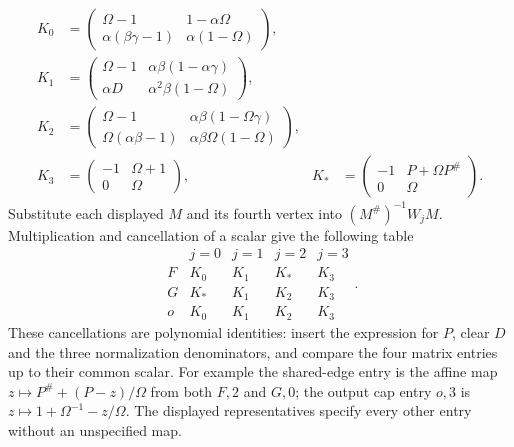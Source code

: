 \begin{equation}\label{sm:world-matrices}
\begin{aligned}
 K_0&=\begin{pmatrix}
 \Omega-1&1-\alpha\Omega\\
 \alpha(\beta\gamma-1)&\alpha(1-\Omega)
 \end{pmatrix},\\
 K_1&=\begin{pmatrix}
 \Omega-1&\alpha\beta(1-\alpha\gamma)\\
 \alpha D&\alpha^2\beta(1-\Omega)
 \end{pmatrix},\\
 K_2&=\begin{pmatrix}
 \Omega-1&\alpha\beta(1-\Omega\gamma)\\
 \Omega(\alpha\beta-1)&\alpha\beta\Omega(1-\Omega)
 \end{pmatrix},\\
 K_3&=\begin{pmatrix}-1&\Omega+1\\0&\Omega\end{pmatrix},
 &K_*&=\begin{pmatrix}-1&P+\Omega P^\#\\0&\Omega\end{pmatrix}.
\end{aligned}
\end{equation}
Substitute each displayed $M$ and its fourth vertex into
$(M^\#)^{-1}W_jM$. Multiplication and cancellation of a scalar
give the following table
\begin{equation}\label{sm:world-table}
 \begin{array}{c|cccc}
 &j=0&j=1&j=2&j=3\\\hline
 F&K_0&K_1&K_*&K_3\\
 G&K_*&K_1&K_2&K_3\\
 o&K_0&K_1&K_2&K_3
 \end{array}.
\end{equation}
These cancellations are polynomial identities: insert the expression
for $P$, clear $D$ and the three normalization denominators, and
compare the four matrix entries up to their common scalar.
For example the shared-edge entry is the affine map
$z\mapsto P^\#+(P-z)/\Omega$ from both $F,2$ and $G,0$;
the output cap entry $o,3$ is
$z\mapsto1+\Omega^{-1}-z/\Omega$.
The displayed representatives specify every other entry without
an unspecified map.

